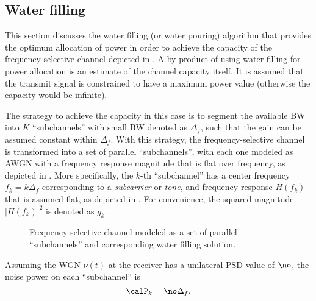 \subsection{Water filling}

This section discusses the water filling (or water pouring) algorithm that provides the optimum allocation of power in order to achieve the capacity of the frequency-selective channel depicted in . A by-product of using water filling for power allocation is an estimate of the channel capacity itself. It is assumed that the transmit signal is constrained to have a maximum power value (otherwise the capacity would be infinite).

The strategy to achieve the capacity in this case is to segment the available BW into $K$ ``subchannels'' with small BW denoted as $\Delta_f$, such that the gain can be assumed constant within $\Delta_f$. With this strategy, the frequency-selective channel is transformed into a set of parallel ``subchannels'', with each one modeled as AWGN with a frequency response magnitude
that is flat over frequency, as depicted in .
More specifically, the $k$-th ``subchannel'' has a center frequency $f_k = k\Delta_f$ corresponding to a \emph{subcarrier} or \emph{tone}, and frequency response $H(f_k)$ that is assumed flat, as depicted in .
For convenience, the squared magnitude $|H(f_k)|^2$ is denoted as $g_k$. 

\begin{figure}[htbp]
\centering
  \caption{Frequency-selective channel modeled as a set of parallel ``subchannels'' and corresponding water filling solution.\label{fig:waterfillingFigs}}
\end{figure}

Assuming the WGN $\nu(t)$ at the receiver has a unilateral PSD value of $\no$, the noise power on each ``subchannel'' is
\begin{equation}
\calP_k = \no \Delta_f.
\label{eq:subchannelNoisePower}
\end{equation}

